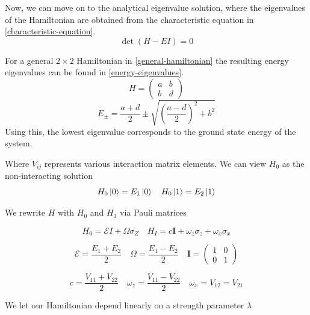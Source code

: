 Now, we can move on to the analytical eigenvalue solution, where the eigenvalues of the Hamiltonian are obtained from the characteristic equation in \cref{characteristic-equation}.
\begin{equation}\label{characteristic-equation}
    \det(H-EI)=0
\end{equation}

For a general $2\times2$ Hamiltonian in \cref{general-hamiltonian} the resulting energy eigenvalues can be found in \cref{energy-eigenvalues}.
\begin{equation}\label{general-hamiltonian}
    H=\begin{pmatrix}
        a&b\\b&d
    \end{pmatrix}
\end{equation}
\begin{equation}\label{energy-eigenvalues}
    E_{\pm} = \frac{a+d}{2}\pm\sqrt{\left(\frac{a-d}{2}\right)^2+b^2}
\end{equation}
Using this, the lowest eigenvalue corresponds to the ground state energy of the system. 

Where $V_{ij}$ represents various interaction matrix elements. We can view $H_0$ as the non-interacting solution
\begin{equation}
    H_0\left| 0 \right\rangle = E_1\left| 0 \right\rangle 
    \quad 
    H_0\left| 1 \right\rangle=E_2\left| 1 \right\rangle
\end{equation}

We rewrite $H$ with $H_0$ and $H_1$ via Pauli matrices

\begin{equation}
    H_0=\mathcal{E}I+\Omega\sigma_Z
    \quad
    H_I=c\textbf{I}+\omega_z\sigma_z+\omega_x\sigma_x
\end{equation}

\begin{equation}
    \mathcal{E} = \frac{E_1+E_2}{2}
    \quad
    \Omega=\frac{E_1-E_2}{2}
    \quad 
    \textbf{I}=\begin{pmatrix}
        1&0\\0&1
    \end{pmatrix}
\end{equation}

\begin{equation}
    c=\frac{V_{11}+V_{22}}{2}
    \quad
    \omega_z=\frac{V_{11}-V_{22}}{2}
    \quad
    \omega_x=V_{12}=V_{21}
\end{equation}

We let our Hamiltonian depend linearly on a strength parameter $\lambda$

